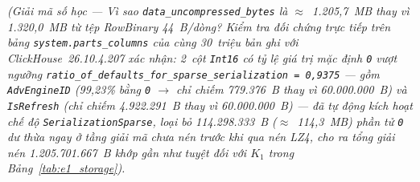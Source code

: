 \documentclass[13pt,a4paper]{report}
\begin{document}
\noindent\textit{(Giải mã số học --- Vì sao \texttt{data\_\allowbreak{}uncompressed\_\allowbreak{}bytes} là $\approx$~1.205,7~MB thay vì 1.320,0~MB từ tệp RowBinary 44~B/dòng? Kiểm tra đối chứng trực tiếp trên bảng \texttt{system.\allowbreak{}parts\_\allowbreak{}columns} của cùng 30~triệu bản ghi với ClickHouse~26.10.4.207 xác nhận: 2~cột \texttt{Int16} có tỷ lệ giá trị mặc định \texttt{0} vượt ngưỡng \texttt{ratio\_\allowbreak{}of\_\allowbreak{}defaults\_\allowbreak{}for\_\allowbreak{}sparse\_\allowbreak{}serialization = 0,9375} --- gồm \texttt{AdvEngineID} (99,23\% bằng \texttt{0} $\rightarrow$ chỉ chiếm 779.376~B thay vì 60.000.000~B) và \texttt{IsRefresh} (chỉ chiếm 4.922.291~B thay vì 60.000.000~B) --- đã tự động kích hoạt chế độ \texttt{SerializationSparse}, loại bỏ 114.298.333~B ($\approx$~114,3~MB) phần tử \texttt{0} dư thừa ngay ở tầng giải mã chưa nén trước khi qua nén LZ4, cho ra tổng giải nén 1.205.701.667~B khớp gần như tuyệt đối với $K_1$ trong Bảng~\ref{tab:e1_storage}).}
\end{document}

